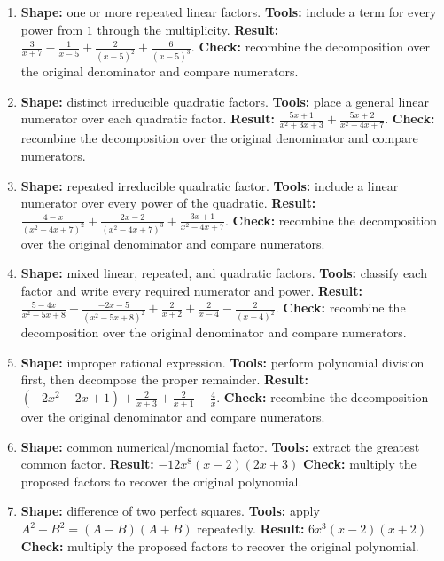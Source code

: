 \documentclass[11pt,oneside]{book}
\begin{document}
\begin{enumerate}[leftmargin=*,label=\textbf{CAP\arabic*.},itemsep=0.45\baselineskip]
\item \textbf{Shape:} one or more repeated linear factors. \textbf{Tools:} include a term for every power from $1$ through the multiplicity. \textbf{Result:} $\displaystyle \frac{3}{x + 7} - \frac{1}{x - 5} + \frac{2}{\left(x - 5\right)^{2}} + \frac{6}{\left(x - 5\right)^{3}}$. \textbf{Check:} recombine the decomposition over the original denominator and compare numerators.
\item \textbf{Shape:} distinct irreducible quadratic factors. \textbf{Tools:} place a general linear numerator over each quadratic factor. \textbf{Result:} $\displaystyle \frac{5 x + 1}{x^{2} + 3 x + 3} + \frac{5 x + 2}{x^{2} + 4 x + 7}$. \textbf{Check:} recombine the decomposition over the original denominator and compare numerators.
\item \textbf{Shape:} repeated irreducible quadratic factor. \textbf{Tools:} include a linear numerator over every power of the quadratic. \textbf{Result:} $\displaystyle \frac{4 - x}{\left(x^{2} - 4 x + 7\right)^{2}} + \frac{2 x - 2}{\left(x^{2} - 4 x + 7\right)^{3}} + \frac{3 x + 1}{x^{2} - 4 x + 7}$. \textbf{Check:} recombine the decomposition over the original denominator and compare numerators.
\item \textbf{Shape:} mixed linear, repeated, and quadratic factors. \textbf{Tools:} classify each factor and write every required numerator and power. \textbf{Result:} $\displaystyle \frac{5 - 4 x}{x^{2} - 5 x + 8} + \frac{- 2 x - 5}{\left(x^{2} - 5 x + 8\right)^{2}} + \frac{2}{x + 2} + \frac{2}{x - 4} - \frac{2}{\left(x - 4\right)^{2}}$. \textbf{Check:} recombine the decomposition over the original denominator and compare numerators.
\item \textbf{Shape:} improper rational expression. \textbf{Tools:} perform polynomial division first, then decompose the proper remainder. \textbf{Result:} $\displaystyle \left(- 2 x^{2} - 2 x + 1\right) + \frac{2}{x + 3} + \frac{2}{x + 1} - \frac{4}{x}$. \textbf{Check:} recombine the decomposition over the original denominator and compare numerators.
\item \textbf{Shape:} common numerical/monomial factor. \textbf{Tools:} extract the greatest common factor. \textbf{Result:} $ - 12 x^{8} \left(x - 2\right) \left(2 x + 3\right) $ \textbf{Check:} multiply the proposed factors to recover the original polynomial.
\item \textbf{Shape:} difference of two perfect squares. \textbf{Tools:} apply $A^2-B^2=(A-B)(A+B)$ repeatedly. \textbf{Result:} $ 6 x^{3} \left(x - 2\right) \left(x + 2\right) $ \textbf{Check:} multiply the proposed factors to recover the original polynomial.

\end{enumerate}
\end{document}
